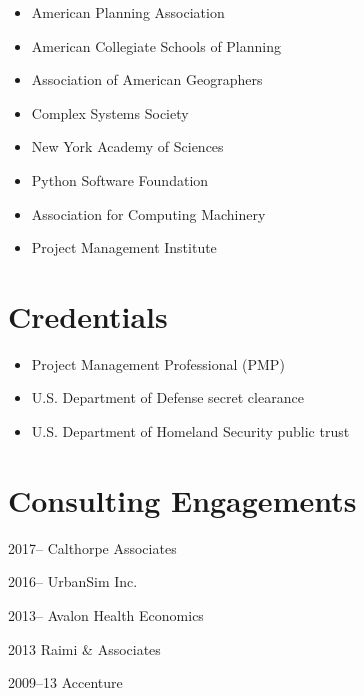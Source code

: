 \documentclass{academiccv}
\begin{document}
\begin{itemize}
	
\item American Planning Association

\item American Collegiate Schools of Planning

\item Association of American Geographers

\item Complex Systems Society

\item New York Academy of Sciences

\item Python Software Foundation

\item Association for Computing Machinery

\item Project Management Institute

\end{itemize}



\section*{Credentials}

\begin{itemize}
	
\item Project Management Professional (PMP)

\item U.S. Department of Defense secret clearance

\item U.S. Department of Homeland Security public trust

\end{itemize}



\section*{Consulting Engagements}

\begin{tablist}
	
\item[2017--]   \tab Calthorpe Associates

\item[2016--]   \tab UrbanSim Inc.

\item[2013--]   \tab Avalon Health Economics

\item[2013]     \tab Raimi \& Associates

\item[2009--13] \tab Accenture

\end{tablist}
\end{document}
